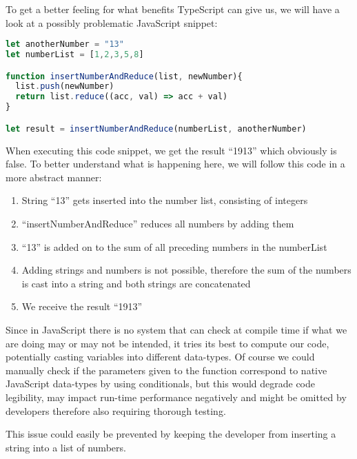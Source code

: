 \documentclass[english,runningheads, letterpaper]{llncs}[2018/03/10]
\begin{document}
\clearpage

To get a better feeling for what benefits TypeScript can give us,
we will have a look at a possibly problematic JavaScript snippet:

\begin{lstlisting}[style=ES6, language=JavaScript, caption="Problematic JavaScript code snippet"]
let anotherNumber = "13"
let numberList = [1,2,3,5,8]

function insertNumberAndReduce(list, newNumber){
  list.push(newNumber)
  return list.reduce((acc, val) => acc + val)
}

let result = insertNumberAndReduce(numberList, anotherNumber)
\end{lstlisting}

When executing this code snippet, we get the result ``1913''
which obviously is false. To better understand what is happening here,
we will follow this code in a more abstract manner:

\begin{enumerate}
\item String ``13'' gets inserted into the number list, consisting of
integers
\item ``insertNumberAndReduce'' reduces all numbers by adding them
\item ``13'' is added on to the sum of all preceding numbers in the numberList
\item Adding strings and numbers is not possible, therefore the sum of the
numbers is cast into a string and both strings are concatenated
\item We receive the result ``1913''
\end{enumerate}

Since in JavaScript there is no system that can check at compile time if what we are doing may or may not
be intended, it tries its best to compute our code, potentially casting variables into different data-types. Of course we could manually check if the parameters given to the function correspond to native JavaScript data-types by using conditionals, but this would  degrade code legibility, may impact run-time performance negatively and might be omitted by developers therefore also requiring thorough testing.

\begin{claim}
This issue could easily be prevented by keeping the developer from inserting
a string into a list of numbers.
\end{claim}

\pagebreak
\end{document}
